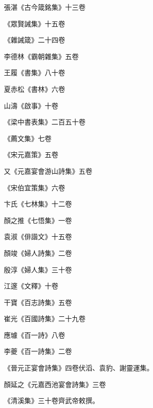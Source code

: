 \begin{pinyinscope}
 張湛《古今箴銘集》十三卷



 《眾賢誡集》十五卷



 《雜誡箴》二十四卷



 李德林《霸朝雜集》五卷



 王履《書集》八十卷



 夏赤松《書林》六卷



 山濤《啟事》十卷



 《梁中書表集》二百五十卷



 《薦文集》七卷



 《宋元嘉策》五卷



 又《元嘉宴會游山詩集》五卷



 《宋伯宜策集》六卷



 卞氏《七林集》十二卷



 顏之推《七悟集》一卷



 袁淑《俳諧文》十五卷



 顏竣《婦人詩集》二卷



 殷淳《婦人集》三十卷



 江邃《文釋》十卷



 干寶《百志詩集》五卷



 崔光《百國詩集》二十九卷



 應璩《百一詩》八卷



 李夔《百一詩集》二卷



 《晉元正宴會詩集》四卷伏滔、袁豹、謝靈運集。



 顏延之《元嘉西池宴會詩集》三卷



 《清溪集》三十卷齊武帝敕撰。




\end{pinyinscope}
